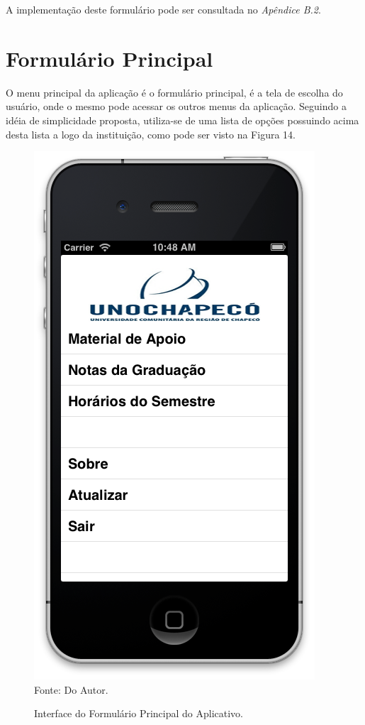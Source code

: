 A implementação deste formulário pode ser consultada no \emph{Apêndice B.2}.

\section{Formulário Principal}

O menu principal da aplicação é o formulário principal, é a tela de escolha do usuário, onde o mesmo pode acessar os outros menus da aplicação. Seguindo a idéia de simplicidade proposta, utiliza-se de uma lista de opções possuindo acima desta lista a logo da instituição, como pode ser visto na Figura 14.

\begin{figure}[!htb]
     \centering
     \caption[Formulário Principal - Interface]{Interface do Formulário Principal do Aplicativo.}
     \includegraphics[scale=0.34]{imagens/formprincipal.png}
     \\  Fonte: Do Autor.
\end{figure}

